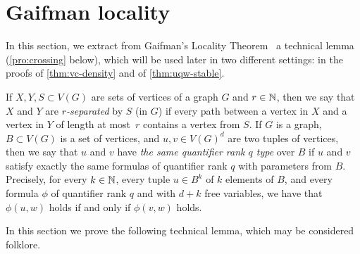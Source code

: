 \section{Gaifman locality}\label{sec:gaifman}
In this section, we extract from Gaifman's Locality Theorem~\cite{gaifman1982local} a technical lemma
(\cref{pro:crossing} below), which will be used later in two different settings: in the proofs of \cref{thm:vc-density} and of \cref{thm:uqw-stable}.



If $X,Y,S\subset V(G)$ are sets of vertices of a graph $G$ 
and $r\in \mathbb{N}$, then we say that $X$ and $Y$ are  \emph{$r$-separated}
by $S$  (in $G$) if every path between a vertex in $X$ and a vertex in 
$Y$ of length at most~$r$ contains a vertex from $S$. If $G$ is a graph, $B\subset V(G)$ is a set of vertices,
and $u,v\in V(G)^d$ are two tuples of vertices, then we say that 
$u$ and $v$ have \emph{the same quantifier rank $q$ type} over $B$
if $u$ and $v$ satisfy exactly the same formulas of quantifier rank $q$ with parameters from $B$.
Precisely,
for every $k\in \mathbb{N}$, every tuple $u\in B^{k}$ of $k$ elements of $B$, and every formula $\phi$ of quantifier rank $q$ and with $d+k$ free variables, we have that $\phi(u,w)$ holds if and only if $\phi(v,w)$ holds.




In this section we prove the following technical lemma, which
may be considered folklore. %


